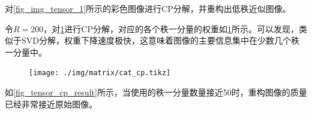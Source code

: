 \begin{example}
    对\cref{fig_img_tensor_1}所示的彩色图像进行CP分解，并重构出低秩近似图像。
\end{example}
\begin{solution}
    令\( R = 200 \)，对\cref{fig_tensor_lam}进行CP分解，对应的各个秩一分量的权重如\cref{fig_tensor_lam}所示。可以发现，类似于SVD分解，权重下降速度极快，这意味着图像的主要信息集中在少数几个秩一分量中。

    \begin{figure}[htb!]
        \centering
        \texttt{[image: ./img/matrix/cat\_cp.tikz]}
        \caption{}
        \label{fig_tensor_lam}
    \end{figure}

    如\cref{fig_tensor_cp_result}所示，当使用的秩一分量数量接近50时，重构图像的质量已经非常接近原始图像。


\end{solution}
